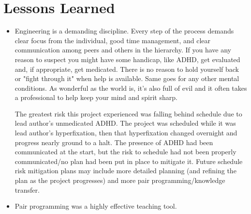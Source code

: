 \section{Lessons Learned}

\begin{itemize}

\item Engineering is a demanding discipline. Every step of the process demands clear focus from the individual, good time management, and clear communication among peers and others in the hierarchy. If you have any reason to suspect you might have some handicap, like ADHD, get evaluated and, if appropriate, get medicated. There is no reason to hold yourself back or "fight through it" when help is available. Same goes for any other mental conditions. As wonderful as the world is, it's also full of evil and it often takes a professional to help keep your mind and spirit sharp. 

The greatest risk this project experienced was falling behind schedule due to lead author's unmedicated ADHD. The project was scheduled while it was lead author's hyperfixation, then that hyperfixation changed overnight and progress nearly ground to a halt. The presence of ADHD had been communicated at the start, but the risk to schedule had not been properly communicated/no plan had been put in place to mitigate it. Future schedule risk mitigation plans may include more detailed planning (and refining the plan as the project progresses) and more pair programming/knowledge transfer.

\item Pair programming was a highly effective teaching tool. 

\end{itemize}

\TODO